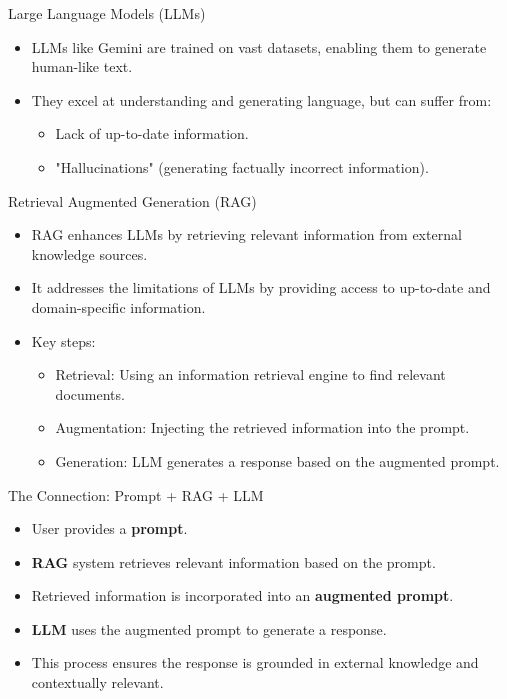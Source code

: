 \documentclass{beamer}
\begin{document}
\begin{frame}{Large Language Models (LLMs)}
  \begin{itemize}
    \item LLMs like Gemini are trained on vast datasets, enabling them to generate human-like text.
    \item They excel at understanding and generating language, but can suffer from:
      \begin{itemize}
        \item Lack of up-to-date information.
        \item "Hallucinations" (generating factually incorrect information).
      \end{itemize}
  \end{itemize}
\end{frame}

\begin{frame}{Retrieval Augmented Generation (RAG)}
  \begin{itemize}
    \item RAG enhances LLMs by retrieving relevant information from external knowledge sources.
    \item It addresses the limitations of LLMs by providing access to up-to-date and domain-specific information.
    \item Key steps:
      \begin{itemize}
        \item Retrieval: Using an information retrieval engine to find relevant documents.
        \item Augmentation: Injecting the retrieved information into the prompt.
        \item Generation: LLM generates a response based on the augmented prompt.
      \end{itemize}
  \end{itemize}
\end{frame}

\begin{frame}{The Connection: Prompt + RAG + LLM}
  \begin{itemize}
    \item User provides a \textbf{prompt}.
    \item \textbf{RAG} system retrieves relevant information based on the prompt.
    \item Retrieved information is incorporated into an \textbf{augmented prompt}.
    \item \textbf{LLM} uses the augmented prompt to generate a response.
    \item This process ensures the response is grounded in external knowledge and contextually relevant.
  \end{itemize}
\end{frame}
\end{document}
